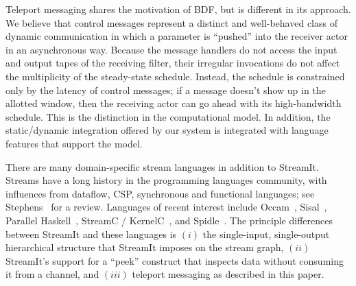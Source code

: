 Teleport messaging shares the motivation of BDF, but is different in
its approach.  We believe that control messages represent a distinct
and well-behaved class of dynamic communication in which a parameter
is ``pushed'' into the receiver actor in an asynchronous way.  Because
the message handlers do not access the input and output tapes of the
receiving filter, their irregular invocations do not affect the
multiplicity of the steady-state schedule.  Instead, the schedule is
constrained only by the latency of control messages; if a message
doesn't show up in the allotted window, then the receiving actor can
go ahead with its high-bandwidth schedule.  This is the distinction in
the computational model.  In addition, the static/dynamic integration
offered by our system is integrated with language features that
support the model.

There are many domain-specific stream languages in addition to
StreamIt.  Streams have a long history in the programming languages
community, with influences from dataflow, CSP, synchronous and
functional languages; see Stephens~\cite{survey97} for a review.
Languages of recent interest include Occam~\cite{occammanual},
Sisal~\cite{sisal}, Parallel Haskell~\cite{ph}, StreamC /
KernelC~\cite{imagine03ieee}, and Spidle~\cite{spidle02}.  The
principle differences between StreamIt and these languages is $(i)$
the single-input, single-output hierarchical structure that StreamIt
imposes on the stream graph, $(ii)$ StreamIt's support for a ``peek''
construct that inspects data without consuming it from a channel, and
$(iii)$ teleport messaging as described in this paper.
